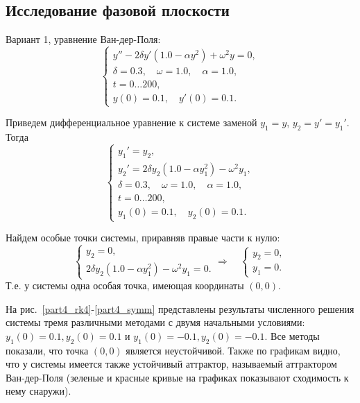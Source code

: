 \documentclass[12pt, a4paper]{article}
\begin{document}
	
	\subsection{Исследование фазовой плоскости}
	
	Вариант 1, уравнение Ван-дер-Поля:
	\begin{equation*}
		\begin{cases}
			y''-2\delta y'(1.0-\alpha y^2)+\omega^2 y = 0,\\
			\delta = 0.3, \quad \omega = 1.0, \quad \alpha = 1.0, \\
			t = 0\dots200, \\
			y(0)=0.1, \quad y'(0)=0.1.
		\end{cases}
	\end{equation*}
	
	Приведем дифференциальное уравнение к системе заменой $y_1 = y$, $y_2 = y' = y_1'$. Тогда
	\begin{equation*}
		\begin{cases}
			y_1' = y_2, \\
			y_2' = 2\delta y_2(1.0-\alpha y_1^2) - \omega^2 y_1, \\
			\delta = 0.3, \quad \omega = 1.0, \quad \alpha = 1.0, \\
			t = 0\dots200, \\
			y_1(0)=0.1, \quad y_2(0)=0.1.
		\end{cases}
	\end{equation*}
	
	Найдем особые точки системы, приравняв правые части к нулю:
	\begin{equation*}
		\begin{cases}
			y_2 = 0, \\
			2\delta y_2(1.0-\alpha y_1^2) - \omega^2 y_1 = 0.
		\end{cases} \Rightarrow \quad
		\begin{cases}
			y_2 = 0, \\
			y_1 = 0.
		\end{cases}
	\end{equation*}
	Т.е. у системы одна особая точка, имеющая координаты $(0, 0)$.
	
	На рис.~\ref{part4_rk4}-\ref{part4_symm} представлены результаты численного решения системы тремя различными методами с двумя начальными условиями: $y_1(0)=0.1, y_2(0)=0.1$ и $y_1(0)= -0.1, y_2(0)=-0.1$. Все методы показали, что точка $(0, 0)$ является неустойчивой. Также по графикам видно, что у системы имеется также устойчивый аттрактор, называемый аттрактором Ван-дер-Поля (зеленые и красные кривые на графиках показывают сходимость к нему снаружи).
	
\end{document}
